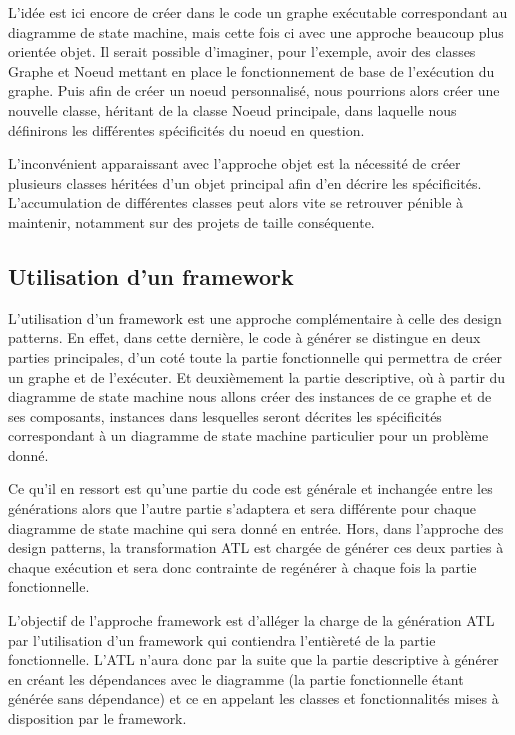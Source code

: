 \documentclass[french, 12pt, a4paper]{article}
\begin{document}
    L'idée est ici encore de créer dans le code un graphe exécutable correspondant au diagramme de state machine, mais cette fois ci avec une approche beaucoup plus orientée objet. Il serait possible d'imaginer, pour l'exemple, avoir des classes Graphe et Noeud mettant en place le fonctionnement de base de l'exécution du graphe. Puis afin de créer un noeud personnalisé, nous pourrions alors créer une nouvelle classe, héritant de la classe Noeud principale, dans laquelle nous définirons les différentes spécificités du noeud en question.
    
    L'inconvénient apparaissant avec l'approche objet est la nécessité de créer plusieurs classes héritées d'un objet principal afin d'en décrire les spécificités. L'accumulation de différentes classes peut alors vite se retrouver pénible à maintenir, notamment sur des projets de taille conséquente.
    
    \subsection{Utilisation d'un framework}
    L'utilisation d'un framework est une approche complémentaire à celle des design patterns. En effet, dans cette dernière, le code à générer se distingue en deux parties principales, d'un coté toute la partie fonctionnelle qui permettra de créer un graphe et de l'exécuter. Et deuxièmement la partie descriptive, où à partir du diagramme de state machine nous allons créer des instances de ce graphe et de ses composants, instances dans lesquelles seront décrites les spécificités correspondant à un diagramme de state machine particulier pour un problème donné.
    
    Ce qu'il en ressort est qu'une partie du code est générale et inchangée entre les générations alors que l'autre partie s'adaptera et sera différente pour chaque diagramme de state machine qui sera donné en entrée. Hors, dans l'approche des design patterns, la transformation ATL est chargée de générer ces deux parties à chaque exécution et sera donc contrainte de regénérer à chaque fois la partie fonctionnelle.
    
    L'objectif de l'approche framework est d'alléger la charge de la génération ATL par l'utilisation d'un framework qui contiendra l'entièreté de la partie fonctionnelle. L'ATL n'aura donc par la suite que la partie descriptive à générer en créant les dépendances avec le diagramme (la partie fonctionnelle étant générée sans dépendance) et ce en appelant les classes et fonctionnalités mises à disposition par le framework.
    
\end{document}
